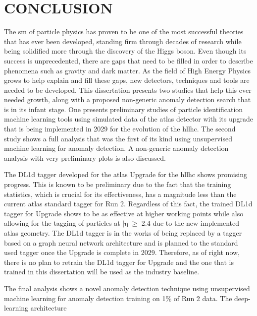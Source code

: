 \begingroup
\clearpage%
\let\clearpage\relax%
\vspace*{-16pt}%
\chapter[CONCLUSION]{CONCLUSION}
\endgroup

The \gls{sm} of particle physics has proven to be one of the most successful theories that has ever been developed, standing firm through decades of research while being 
solidified more through the discovery of the Higgs boson. Even though its success is unprecedented, there are gaps that need to be filled in order to describe phenomena 
such as gravity and dark matter. As the field of High Energy Physics grows to help explain and fill these gaps, new detectors, techniques and tools are needed to be 
developed. This dissertation presents two studies that help this ever needed growth, along with a proposed non-generic anomaly detection search that is in its infant stage.
One presents preliminary studies of particle identification machine learning tools using 
simulated data of the \gls{atlas} detector with its upgrade that is being implemented in 2029 for the evolution of the \gls{hllhc}. The second study shows a full analysis 
that was the first of its kind using unsupervised machine learning for anomaly detection. A non-generic anomaly detection analysis with very preliminary plots is also discussed. 
\par
The DL1d tagger developed for the \gls{atlas} Upgrade for the \gls{hllhc} shows promising progress. This is known to be preliminary due to the fact that the training statistics,
which is crucial for its effectiveness, has a magnitude less than the current \gls{atlas} standard tagger for Run 2. Regardless of this fact, the trained DL1d tagger for Upgrade
shows to be as effective at higher working points while also allowing for the tagging of particles at $|\textrm{η}| \ge$ 2.4 due to the new implemented \gls{atlas} geometry. 
The DL1d tagger is in the works of being replaced by a tagger based on a graph neural network architecture and is planned to the standard used tagger once the Upgrade is complete 
in 2029. Therefore, as of right now, there is no plan to retrain the DL1d tagger for Upgrade and the one that is trained in this dissertation will be used as the industry baseline. 
\par
The final analysis shows a novel anomaly detection technique using unsupervised machine learning for anomaly detection training on 1\% of Run 2 data. The deep-learning architecture

